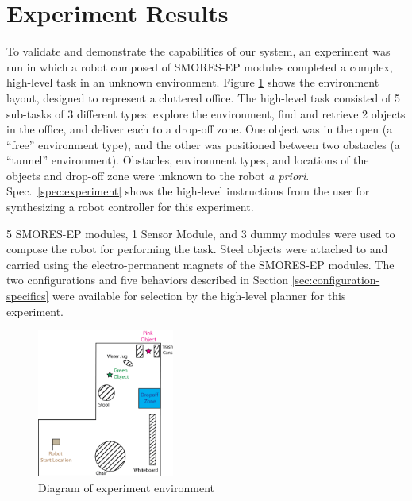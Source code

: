 \documentclass[conference]{IEEEtran}
\begin{document}
\section{Experiment Results}
\label{sec:experiments}
%

To validate and demonstrate the capabilities of our system, an experiment was run in which a robot composed of SMORES-EP modules completed a complex, high-level task in an unknown environment. Figure \ref{fig:map} shows the environment layout, designed to represent a cluttered office. The high-level task consisted of 5 sub-tasks of 3 different types: explore the environment, find and retrieve 2 objects in the office, and deliver each to a drop-off zone. One object was in the open (a ``free'' environment type), and the other was positioned between two obstacles (a ``tunnel'' environment). Obstacles, environment types, and locations of the objects and drop-off zone were unknown to the robot \textit{a priori}.
Spec.~\ref{spec:experiment} shows the high-level instructions from the user for synthesizing a robot controller for this experiment.

5 SMORES-EP modules, 1 Sensor Module, and 3 dummy modules were used to compose the robot for performing the task. Steel objects were attached to and carried using the electro-permanent magnets of the SMORES-EP modules.
The two configurations and five behaviors described in Section \ref{sec:configuration-specifics} were available for selection by the high-level planner for this experiment.


\begin{figure}
\begin{center}
\includegraphics[width=0.4\textwidth]{images/RSSMap.png}
\caption{Diagram of experiment environment}
\label{fig:map}
\end{center}
\end{figure}
\end{document}
